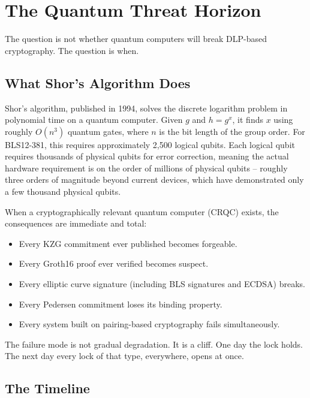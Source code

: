 \documentclass[
  11pt,
  openany]{report}
\providecommand{\tightlist}{%
  \setlength{\itemsep}{0pt}\setlength{\parskip}{0pt}}
\begin{document}
\section{The Quantum Threat Horizon}\label{the-quantum-threat-horizon}

The question is not whether quantum computers will break DLP-based cryptography.
The question is when.

\subsection{What Shor's Algorithm Does}\label{what-shors-algorithm-does}

Shor's algorithm, published in 1994, solves the discrete logarithm problem in
polynomial time on a quantum computer. Given \(g\) and \(h = g^x\), it finds
\(x\) using roughly \(O(n^3)\) quantum gates, where \(n\) is the bit length of
the group order. For BLS12-381, this requires approximately 2,500 logical
qubits. Each logical qubit requires thousands of physical qubits for error
correction, meaning the actual hardware requirement is on the order of millions
of physical qubits -- roughly three orders of magnitude beyond current devices,
which have demonstrated only a few thousand physical qubits.

When a cryptographically relevant quantum computer (CRQC) exists, the
consequences are immediate and total:

\begin{itemize}
\tightlist
\item
  Every KZG commitment ever published becomes forgeable.
\item
  Every Groth16 proof ever verified becomes suspect.
\item
  Every elliptic curve signature (including BLS signatures and ECDSA) breaks.
\item
  Every Pedersen commitment loses its binding property.
\item
  Every system built on pairing-based cryptography fails simultaneously.
\end{itemize}

The failure mode is not gradual degradation. It is a cliff. One day the lock
holds. The next day every lock of that type, everywhere, opens at once.

\subsection{The Timeline}\label{the-timeline}
\end{document}
